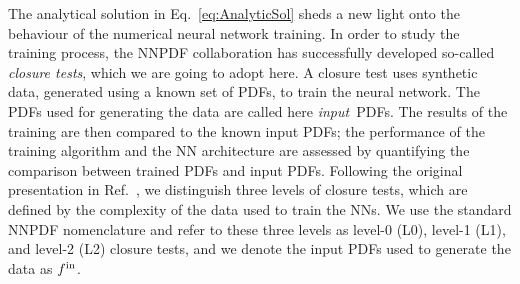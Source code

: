The analytical solution in Eq.~\eqref{eq:AnalyticSol} sheds a new light onto the
behaviour of the numerical neural network training. In order to study the
training process, the NNPDF collaboration has successfully developed so-called
{\em closure tests}, which we are going to adopt here. A closure test uses synthetic data, 
generated using a known
set of PDFs, to train the neural network. The PDFs used for generating the data
are called here {\em input}\ PDFs. The results of the training are then compared
to the known input PDFs; the performance of the training algorithm and the NN
architecture are assessed by quantifying the comparison between trained PDFs and
input PDFs. Following the original presentation in Ref.~\cite{NNPDF:2014otw}, we
distinguish three levels of closure tests, which are defined by the complexity
of the data used to train the NNs. We use the standard NNPDF nomenclature and
refer to these three levels as level-0 (L0), level-1 (L1), and level-2 (L2)
closure tests, and we denote the input PDFs used to generate the data as $f^{\rm in}$.


